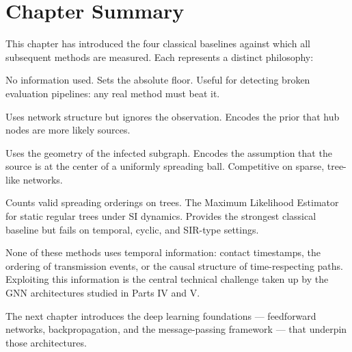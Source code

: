 \section{Chapter Summary}
\label{sec:classical-summary}

This chapter has introduced the four classical baselines against which all subsequent
methods are measured. Each represents a distinct philosophy:

\begin{description}[leftmargin=2em, style=nextline]
  \item[Uniform random guess] No information used. Sets the absolute floor.
        Useful for detecting broken evaluation pipelines: any real method must beat it.
  \item[Degree centrality] Uses network structure but ignores the observation.
        Encodes the prior that hub nodes are more likely sources.
  \item[Jordan Center] Uses the geometry of the infected subgraph.
        Encodes the assumption that the source is at the center of a uniformly spreading
        ball. Competitive on sparse, tree-like networks.
  \item[Rumor Centrality] Counts valid spreading orderings on trees.
        The Maximum Likelihood Estimator for static regular trees under SI dynamics.
        Provides the strongest classical baseline but fails on temporal, cyclic, and
        SIR-type settings.
\end{description}

None of these methods uses temporal information: contact timestamps, the ordering of
transmission events, or the causal structure of time-respecting paths. Exploiting this
information is the central technical challenge taken up by the GNN architectures
studied in Parts IV and V.

The next chapter introduces the deep learning foundations --- feedforward networks,
backpropagation, and the message-passing framework --- that underpin those architectures.
